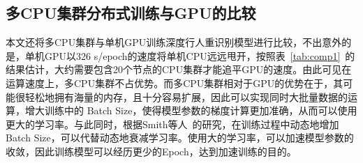 \subsection{多CPU集群分布式训练与GPU的比较}

本文还将多CPU集群与单机GPU训练深度行人重识别模型进行比较，不出意外的是，单机GPU以326 s/epoch的速度将单机CPU远远甩开，按照表~\ref{tab:comp1}~的结果估计，大约需要包含20个节点的CPU集群才能追平GPU的速度。由此可见在运算速度上，多CPU集群不占优势。而多CPU集群相对于GPU的优势在于，其可能很轻松地拥有海量的内存，且十分容易扩展，因此可以实现同时大批量数据的运算，增大训练中的 Batch Size，使得模型参数的梯度计算更加准确，从而可以使用更大的学习率。与此同时，根据Smith等人~\cite{smith2017don}的研究，在训练过程中动态地增加Batch Size，可以代替动态地衰减学习率。使用大的学习率，可以加速模型参数的收敛，因此训练模型可以经历更少的Epoch，达到加速训练的目的。


